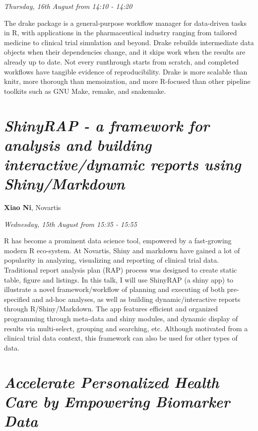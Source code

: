 \documentclass[]{book}
\theoremstyle{definition}
\theoremstyle{definition}
\theoremstyle{definition}
\theoremstyle{remark}
\begin{document}
\emph{Thursday, 16th August from 14:10 - 14:20}

The drake package is a general-purpose workflow manager for data-driven
tasks in R, with applications in the pharmaceutical industry ranging
from tailored medicine to clinical trial simulation and beyond. Drake
rebuilds intermediate data objects when their dependencies change, and
it skips work when the results are already up to date. Not every
runthrough starts from scratch, and completed workflows have tangible
evidence of reproducibility. Drake is more scalable than knitr, more
thorough than memoization, and more R-focused than other pipeline
toolkits such as GNU Make, remake, and snakemake.

\hypertarget{shinyrap---a-framework-for-analysis-and-building-interactivedynamic-reports-using-shinymarkdown}{%
\section{\texorpdfstring{\emph{ShinyRAP - a framework for analysis and
building interactive/dynamic reports using
Shiny/Markdown}}{ShinyRAP - a framework for analysis and building interactive/dynamic reports using Shiny/Markdown}}\label{shinyrap---a-framework-for-analysis-and-building-interactivedynamic-reports-using-shinymarkdown}}

\textbf{Xiao Ni}, Novartis

\emph{Wednesday, 15th August from 15:35 - 15:55}

R has become a prominent data science tool, empowered by a fast-growing
modern R eco-system. At Novartis, Shiny and markdown have gained a lot
of popularity in analyzing, visualizing and reporting of clinical trial
data. Traditional report analysis plan (RAP) process was designed to
create static table, figure and listings. In this talk, I will use
ShinyRAP (a shiny app) to illustrate a novel framework/workflow of
planning and executing of both pre-specified and ad-hoc analyses, as
well as building dynamic/interactive reports through R/Shiny/Markdown.
The app features efficient and organized programming through meta-data
and shiny modules, and dynamic display of results via multi-select,
grouping and searching, etc. Although motivated from a clinical trial
data context, this framework can also be used for other types of data.

\hypertarget{accelerate-personalized-health-care-by-empowering-biomarker-data}{%
\section{\texorpdfstring{\emph{Accelerate Personalized Health Care by
Empowering Biomarker
Data}}{Accelerate Personalized Health Care by Empowering Biomarker Data}}\label{accelerate-personalized-health-care-by-empowering-biomarker-data}}
\end{document}
